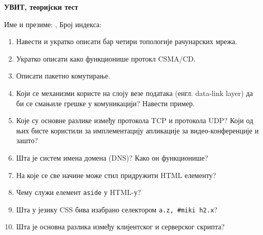 \documentclass[a4paper]{article}
\begin{document}
\begin{center}
\textbf{УВИТ, теоријски тест}  
\end{center}
Име и презиме: \hrulefill, Број индекса: \hrulefill
\begin{enumerate}

\item Навести и укратко описати бар четири топологије рачунарских мрежа. 

\hrulefill

\hrulefill

\hrulefill

\item Укратко описати како функционише протокл CSMA/CD. 

\hrulefill

\hrulefill

\hrulefill

\item Описати пакетно комутирање.

\hrulefill

\hrulefill

\hrulefill

\item Који се механизми користе на слоју везе података (енгл.
data-link layer) да би се смањиле грешке у комуникацији? Навести пример.

\hrulefill

\hrulefill

\hrulefill

\item Које су основне разлике између протокола TCP и протокола UDP?
Који од њих бисте користили за имплементацију апликације за видео-конференције и зашто?

\hrulefill

\hrulefill

\hrulefill

\item Шта је систем имена домена (DNS)? Како он функционише?

\hrulefill

\hrulefill

\hrulefill

\item На које се све начине може стил придружити HTML елементу?

\hrulefill

\hrulefill

\hrulefill

\item Чему служи елемент \verb|aside| у HTML-у?

\hrulefill

\hrulefill

\hrulefill

\item Шта у језику CSS бива изабрано селектором \verb|а.z, #miki h2.x|?

\hrulefill

\hrulefill

\hrulefill

\item Шта је основна разлика између клијентског и серверског скрипта?

\hrulefill

\hrulefill

\hrulefill


\end{enumerate}
\end{document}
